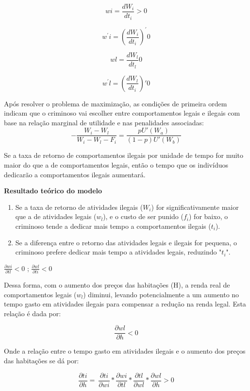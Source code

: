 \documentclass[12pt]{article}
\begin{document}
\[wi = \frac{dW_{i}}{dt_{i}} > 0\]

\[w^{'}i = \left( \frac{dW_{i}}{dt_{i}} \right)^{'}0\]

\[wl = \frac{dW_{l}}{dt_{l}}0\]

\[w^{'}l = (\frac{dW_{l}}{dt_{i}})'0\]

Após resolver o problema de maximização, as condições de primeira ordem
indicam que o criminoso vai escolher entre comportamentos legais e
ilegais com base na relação marginal de utilidade e nas penalidades
associadas:
\[- \frac{W_{i} - W_{l}}{W_{i} - W_{l} - F_{i}} = \frac{pU'(W_{a})}{(1 - p)U'(W_{b})}\]

Se a taxa de retorno de comportamentos ilegais por unidade de tempo for
muito maior do que a de comportamentos legais, então o tempo que os
indivíduos dedicarão a comportamentos ilegais aumentará.


 \vspace*{1cm}
\textbf{Resultado teórico do modelo}

\begin{enumerate}
    \item Se a taxa de retorno de atividades ilegais (\(W_{i}\)) for
significativamente maior que a de atividades legais (\(w_{l}\)), e o
custo de ser punido (\(f_{i}\)) for baixo, o criminoso tende a dedicar
mais tempo a comportamentos ilegais (\(t_{i}\)).
    
    \item Se a diferença entre o retorno das atividades legais e ilegais for
pequena, o criminoso prefere dedicar mais tempo a atividades legais,
reduzindo "\(t_{i}\)".
\end{enumerate}


\begin{center}
\(\frac{\partial wi}{\partial tl} < 0\) ;
\(\frac{\partial wl}{\partial ti} < 0\)
\end{center}

Dessa forma, com o aumento dos preços das habitações (H), a renda real
de comportamentos legais (\(w_{l}\)) diminui, levando potencialmente a
um aumento no tempo gasto em atividades ilegais para compensar a redução
na renda legal. Esta relação é dada por:


\[\frac{\partial wl}{\partial h} < 0\]

Onde a relação entre o tempo gasto em atividades ilegais e o aumento dos
preços das habitações se dá por:

\[\frac{\partial ti}{\partial h} = \ \frac{\partial ti}{\partial wi}*\frac{\partial wi}{\partial tl}*\frac{\partial tl}{\partial wl}*\frac{\partial wl}{\partial h} > 0\]
\end{document}
